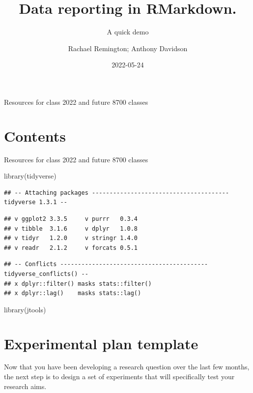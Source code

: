 \documentclass[
]{book}
\title{Data reporting in RMarkdown.}
\subtitle{A quick demo}
\author{Rachael Remington; Anthony Davidson}
\date{2022-05-24}
\newenvironment{Shaded}{\begin{snugshade}}{\end{snugshade}}
\newcommand{\FunctionTok}[1]{\textcolor[rgb]{0.00,0.00,0.00}{#1}}
\newcommand{\NormalTok}[1]{#1}
\begin{document}
\maketitle

{
\setcounter{tocdepth}{1}
\tableofcontents
}
Resources for class 2022 and future 8700 classes

\hypertarget{contents}{%
\chapter{Contents}\label{contents}}

Resources for class 2022 and future 8700 classes

\begin{Shaded}
\begin{Highlighting}[]
\FunctionTok{library}\NormalTok{(tidyverse)}
\end{Highlighting}
\end{Shaded}

\begin{verbatim}
## -- Attaching packages --------------------------------------- tidyverse 1.3.1 --
\end{verbatim}

\begin{verbatim}
## v ggplot2 3.3.5     v purrr   0.3.4
## v tibble  3.1.6     v dplyr   1.0.8
## v tidyr   1.2.0     v stringr 1.4.0
## v readr   2.1.2     v forcats 0.5.1
\end{verbatim}

\begin{verbatim}
## -- Conflicts ------------------------------------------ tidyverse_conflicts() --
## x dplyr::filter() masks stats::filter()
## x dplyr::lag()    masks stats::lag()
\end{verbatim}

\begin{Shaded}
\begin{Highlighting}[]
\FunctionTok{library}\NormalTok{(jtools)}
\end{Highlighting}
\end{Shaded}

\hypertarget{experimental-plan-template}{%
\chapter{Experimental plan template}\label{experimental-plan-template}}

Now that you have been developing a research question over the last few months, the next step is to design a set of experiments that will specifically test your research aims.
\end{document}

